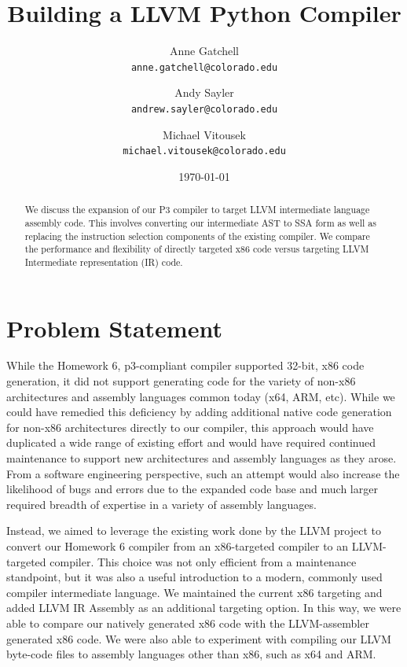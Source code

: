 \documentclass[11pt,twocolumn]{article}
\begin{document}
\title{
  Building a LLVM Python Compiler
}

\author{
  Anne Gatchell    \\ \texttt{anne.gatchell@colorado.edu} \and
  Andy Sayler      \\ \texttt{andrew.sayler@colorado.edu} \and
  Michael Vitousek \\ \texttt{michael.vitousek@colorado.edu}
}

\date{\today}

\maketitle

\begin{abstract}

We discuss the expansion of our P3 compiler to target LLVM intermediate
language assembly code. This involves converting our intermediate
AST to SSA form as well as replacing the instruction selection
components of the existing compiler. We compare the performance and
flexibility of directly targeted x86 code versus targeting LLVM 
Intermediate representation (IR) code.

\end{abstract}

\section{Problem Statement}

While the Homework 6, p3-compliant compiler supported 32-bit, x86
code generation, it did not support generating code for the variety
of non-x86 architectures and assembly languages common today (x64,
ARM, etc). While we could have remedied this deficiency by adding 
additional native code generation for non-x86 architectures directly 
to our compiler, this approach would have duplicated a wide range of existing
effort and would have required continued maintenance to support new
architectures and assembly languages as they arose. From a software
engineering perspective, such an attempt would also increase the
likelihood of bugs and errors due to the expanded code base and much
larger required breadth of expertise in a variety of assembly
languages.

Instead, we aimed to leverage the existing work done by the LLVM project
\cite{llvm.org} to convert our Homework 6 compiler from an x86-targeted
compiler to an LLVM-targeted compiler. This choice was not only efficient
from a maintenance standpoint, but it was also a useful
introduction to a modern, commonly used compiler intermediate
language. We maintained the current x86 targeting and added LLVM IR
Assembly \cite{lattner-llvmlangref} as an additional targeting
option. In this way, we were able to compare our natively generated
x86 code with the LLVM-assembler generated x86 code. We were also
able to experiment with compiling our LLVM byte-code files to assembly
languages other than x86, such as x64 and ARM.
\end{document}

